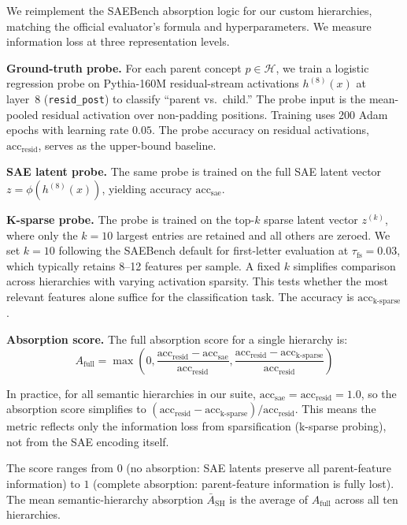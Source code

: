 \documentclass{article}
\begin{document}
We reimplement the SAEBench absorption logic for our custom hierarchies, matching the official evaluator's formula and hyperparameters. We measure information loss at three representation levels.

\textbf{Ground-truth probe.} For each parent concept $p \in \mathcal{H}$, we train a logistic regression probe on Pythia-160M residual-stream activations $h^{(8)}(x)$ at layer~8 (\texttt{resid\_post}) to classify ``parent vs.~child.'' The probe input is the mean-pooled residual activation over non-padding positions. Training uses 200 Adam epochs with learning rate $0.05$. The probe accuracy on residual activations, $\text{acc}_{\text{resid}}$, serves as the upper-bound baseline.

\textbf{SAE latent probe.} The same probe is trained on the full SAE latent vector $z = \phi(h^{(8)}(x))$, yielding accuracy $\text{acc}_{\text{sae}}$.

\textbf{K-sparse probe.} The probe is trained on the top-$k$ sparse latent vector $z^{(k)}$, where only the $k = 10$ largest entries are retained and all others are zeroed. We set $k = 10$ following the SAEBench default for first-letter evaluation at $\tau_{\text{fs}} = 0.03$, which typically retains 8--12 features per sample. A fixed $k$ simplifies comparison across hierarchies with varying activation sparsity. This tests whether the most relevant features alone suffice for the classification task. The accuracy is $\text{acc}_{\text{k-sparse}}$.

\textbf{Absorption score.} The full absorption score for a single hierarchy is:
\begin{equation}
A_{\text{full}} = \max\left(0, \frac{\text{acc}_{\text{resid}} - \text{acc}_{\text{sae}}}{\text{acc}_{\text{resid}}}, \frac{\text{acc}_{\text{resid}} - \text{acc}_{\text{k-sparse}}}{\text{acc}_{\text{resid}}}\right)
\end{equation}

In practice, for all semantic hierarchies in our suite, $\text{acc}_{\text{sae}} = \text{acc}_{\text{resid}} = 1.0$, so the absorption score simplifies to $(\text{acc}_{\text{resid}} - \text{acc}_{\text{k-sparse}}) / \text{acc}_{\text{resid}}$. This means the metric reflects only the information loss from sparsification (k-sparse probing), not from the SAE encoding itself.

The score ranges from $0$ (no absorption: SAE latents preserve all parent-feature information) to $1$ (complete absorption: parent-feature information is fully lost). The mean semantic-hierarchy absorption $\bar{A}_{\text{SH}}$ is the average of $A_{\text{full}}$ across all ten hierarchies.
\end{document}
